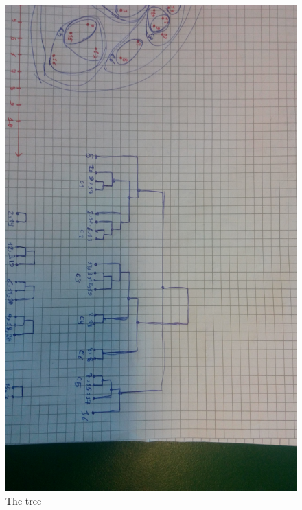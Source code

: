 \documentclass{article}
\begin{document}
\begin{figure}[H]
\includegraphics[angle=90,scale=0.23,trim={15cm 15cm 25cm 37cm},clip]{complete_tree.jpg}
\caption{The tree}
\end{figure}
\end{document}
